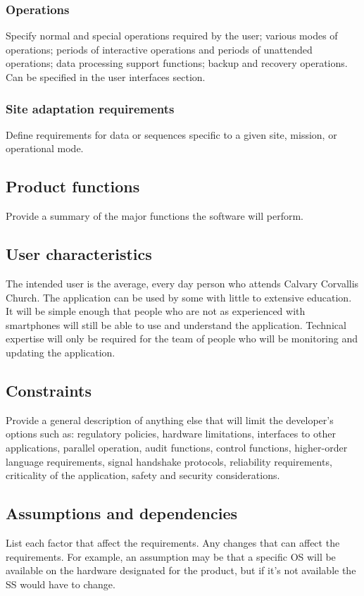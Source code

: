 \documentclass[letterpaper,10pt,draftclsnofoot,onecolumn,titlepage]{IEEEtran}
\begin{document}
	\subsubsection{Operations}
	Specify normal and special operations required by the user; various modes of operations; periods of interactive operations and periods of unattended operations; data processing support functions; backup and recovery operations.
	Can be specified in the user interfaces section.

	\subsubsection{Site adaptation requirements}
	Define requirements for data or sequences specific to a given site, mission, or operational mode.

	\subsection{Product functions}
	Provide a summary of the major functions the software will perform.

	\subsection{User characteristics}
	The intended user is the average, every day person who attends Calvary Corvallis Church.
	The application can be used by some with little to extensive education.
	It will be simple enough that people who are not as experienced with smartphones will still be able to use and understand the application.
	Technical expertise will only be required for the team of people who will be monitoring and updating the application.

	\subsection{Constraints}
	Provide a general description of anything else that will limit the developer's options such as: regulatory policies, hardware limitations, interfaces to other applications, parallel operation, audit functions, control functions, higher-order language requirements, signal handshake protocols, reliability requirements, criticality of the application, safety and security considerations.

	\subsection{Assumptions and dependencies}
	List each factor that affect the requirements.
	Any changes that can affect the requirements.
	For example, an assumption may be that a specific OS will be available on the hardware designated for the product, but if it's not available the SS would have to change.
\end{document}
